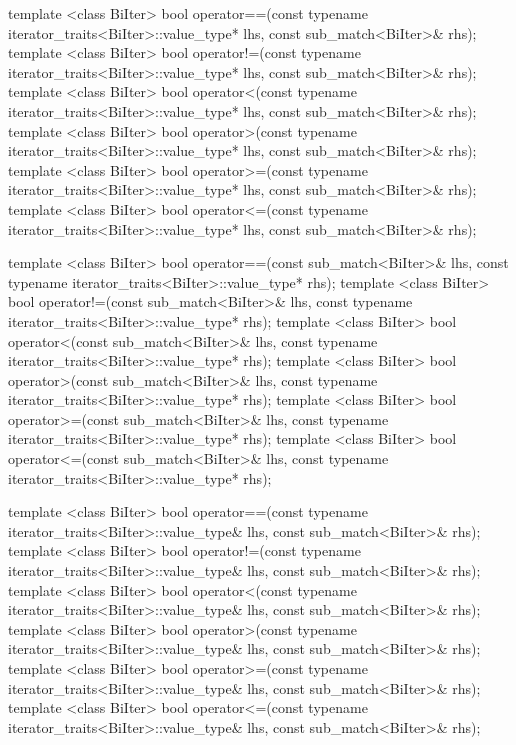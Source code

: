 \begin{codeblock}
{  template <class BiIter>
    bool operator==(const typename iterator_traits<BiIter>::value_type* lhs,
                    const sub_match<BiIter>& rhs);
  template <class BiIter>
    bool operator!=(const typename iterator_traits<BiIter>::value_type* lhs,
                    const sub_match<BiIter>& rhs);
  template <class BiIter>
    bool operator<(const typename iterator_traits<BiIter>::value_type* lhs,
                   const sub_match<BiIter>& rhs);
  template <class BiIter>
    bool operator>(const typename iterator_traits<BiIter>::value_type* lhs,
                   const sub_match<BiIter>& rhs);
  template <class BiIter>
    bool operator>=(const typename iterator_traits<BiIter>::value_type* lhs,
                    const sub_match<BiIter>& rhs);
  template <class BiIter>
    bool operator<=(const typename iterator_traits<BiIter>::value_type* lhs,
                    const sub_match<BiIter>& rhs);

  template <class BiIter>
    bool operator==(const sub_match<BiIter>& lhs,
                    const typename iterator_traits<BiIter>::value_type* rhs);
  template <class BiIter>
    bool operator!=(const sub_match<BiIter>& lhs,
                    const typename iterator_traits<BiIter>::value_type* rhs);
  template <class BiIter>
    bool operator<(const sub_match<BiIter>& lhs,
                   const typename iterator_traits<BiIter>::value_type* rhs);
  template <class BiIter>
    bool operator>(const sub_match<BiIter>& lhs,
                   const typename iterator_traits<BiIter>::value_type* rhs);
  template <class BiIter>
    bool operator>=(const sub_match<BiIter>& lhs,
                    const typename iterator_traits<BiIter>::value_type* rhs);
  template <class BiIter>
    bool operator<=(const sub_match<BiIter>& lhs,
                    const typename iterator_traits<BiIter>::value_type* rhs);

  template <class BiIter>
    bool operator==(const typename iterator_traits<BiIter>::value_type& lhs,
                    const sub_match<BiIter>& rhs);
  template <class BiIter>
    bool operator!=(const typename iterator_traits<BiIter>::value_type& lhs,
                    const sub_match<BiIter>& rhs);
  template <class BiIter>
    bool operator<(const typename iterator_traits<BiIter>::value_type& lhs,
                   const sub_match<BiIter>& rhs);
  template <class BiIter>
    bool operator>(const typename iterator_traits<BiIter>::value_type& lhs,
                   const sub_match<BiIter>& rhs);
  template <class BiIter>
    bool operator>=(const typename iterator_traits<BiIter>::value_type& lhs,
                    const sub_match<BiIter>& rhs);
  template <class BiIter>
    bool operator<=(const typename iterator_traits<BiIter>::value_type& lhs,
                    const sub_match<BiIter>& rhs);

}
\end{codeblock}
